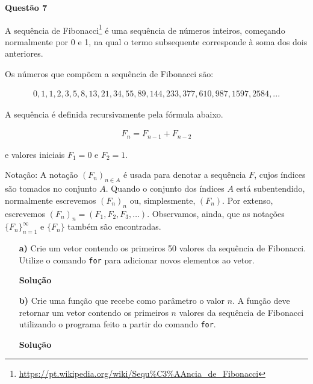 \documentclass[12pt, a4paper]{article}
\begin{document}
\textbf{Questão 7}

A sequência de Fibonacci\footnote{\url{https://pt.wikipedia.org/wiki/Sequ\%C3\%AAncia\_de\_Fibonacci}} é uma sequência de números inteiros, começando normalmente por 0 e 1, na qual o termo subsequente corresponde à soma dos dois anteriores.

Os números que compõem a sequência de Fibonacci são:

\begin{align*}
	0,1, 1, 2, 3, 5, 8, 13, 21, 34, 55, 89, 144, 233, 377, 610, 987, 1597, 2584, ...
\end{align*}

A sequência é definida recursivamente pela fórmula abaixo.

\begin{align*}
	F_n = F_{n-1} + F_{n-2}
\end{align*}

e valores iniciais $F_1 = 0$ e $F_2 = 1$.

Notação: A notação $(F_n)_{n\in A}$ é usada para denotar a sequência $F$, cujos índices são tomados no conjunto $A$. Quando o conjunto dos índices $A$ está subentendido, normalmente escrevemos $(F_{n})_{{n}}$ ou, simplesmente, $(F_{n})$. Por extenso, escrevemos $(F_{n})_{n}=(F_{1},F_{2},F_{3},\ldots )$. Observamos, ainda, que as notações $\{F_{n}\}_{{n=1}}^{{\infty }}$ e $\{F_{n}\}$ também são encontradas.



\begin{itemize}
	\item[\textbf{a)}] Crie um vetor contendo os primeiros 50 valores da sequência de Fibonacci. Utilize o comando \texttt{for} para adicionar novos elementos ao vetor.
	
	
	
	\textbf{Solução}
	
	
	
	
	
	\item[\textbf{b)}] Crie uma função que recebe como parâmetro o valor $n$. A função deve retornar um vetor contendo os primeiros $n$ valores da sequência de Fibonacci utilizando o programa feito a partir do comando \texttt{for}.
	
	
	
	\textbf{Solução}
	
	
	
	
	
\end{itemize}
\end{document}
